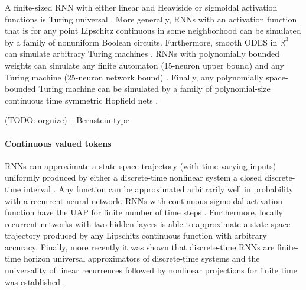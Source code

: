 \documentclass{article}
\newcommand{\ascomment}[1]{\textcolor{ascolor}{(#1)}}
\theoremstyle{definition} \newtheorem{definition}{Definition}
\theoremstyle{remark} \newtheorem{remark}{Remark}
\newcommand{\reals}{\mathbb{R}}
\newcounter{ct}
\begin{document}
A finite-sized RNN with either linear and Heaviside or sigmoidal activation functions is Turing universal \citep{pollack1991induction, siegelmann1992computational,kilian1996universality}.
More generally, RNNs with an activation function that is for any point Lipschitz continuous in some neighborhood can be simulated by a family of nonuniform Boolean circuits\citep{siegelmann1994analog}.
Furthermore, smooth ODES in $\reals^3$ can simulate arbitrary Turing machines \citep{branicky1995universal}. %
RNNs with polynomially bounded weights can simulate any finite automaton (15-neuron upper bound) and any Turing machine (25-neuron network bound) \citep{indyk1995optimal}.
Finally, any polynomially space-bounded Turing machine can be simulated by a family of polynomial-size continuous time symmetric Hopfield nets \citep{sima2003continuous}.

\ascomment{TODO: orgnize} 
\citep{moore1990unpredictability,moore1998finite}
\citep{cabessa2019turing}
\citep{perez2019turing}
\citep{chung2021turing}
\citep{perez2021attention}
\citep{giannou2023looped}
\citep{stogin2024provably}
 \citep{nowak2023representational, nowak2024representational}
+Bernstein-type \citep{veeravalli2023nonlinear}


\paragraph{Continuous valued tokens}
RNNs can approximate a state space trajectory (with time-varying inputs) uniformly  produced by either a discrete-time nonlinear system a closed discrete-time interval \citep{jin1995universal}.
Any function can be approximated arbitrarily well in probability with a recurrent neural network\citep{hammer2000approximation}.  %
RNNs with continuous sigmoidal activation function have the UAP for finite number of time steps \citep{schafer2006recurrent, schafer2007uap}.
Furthermore, locally recurrent networks with two hidden layers is able to approximate a state-space trajectory produced by any Lipschitz continuous function with arbitrary accuracy\citep{patan2008approximation}.
Finally, more recently it was shown that discrete-time RNNs are finite-time horizon universal approximators of discrete-time systems \citep{aguiar2023universal} and the universality of linear recurrences followed by nonlinear projections for finite time was established \citep{orvieto2023universality}.
\end{document}
